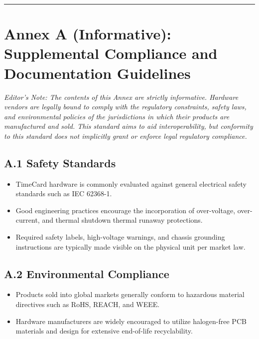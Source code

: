 \begin{center}\rule{0.5\linewidth}{0.5pt}\end{center}

\section{Annex A (Informative): Supplemental Compliance and
Documentation
Guidelines}\label{annex-a-informative-supplemental-compliance-and-documentation-guidelines}

\emph{Editor's Note: The contents of this Annex are strictly
informative. Hardware vendors are legally bound to comply with the
regulatory constraints, safety laws, and environmental policies of the
jurisdictions in which their products are manufactured and sold. This
standard aims to aid interoperability, but conformity to this standard
does not implicitly grant or enforce legal regulatory compliance.}

\subsection{A.1 Safety Standards}\label{a.1-safety-standards}

\begin{itemize}
\tightlist
\item
  TimeCard hardware is commonly evaluated against general electrical
  safety standards such as IEC 62368-1.
\item
  Good engineering practices encourage the incorporation of
  over-voltage, over-current, and thermal shutdown thermal runaway
  protections.
\item
  Required safety labels, high-voltage warnings, and chassis grounding
  instructions are typically made visible on the physical unit per
  market law.
\end{itemize}

\subsection{A.2 Environmental
Compliance}\label{a.2-environmental-compliance}

\begin{itemize}
\tightlist
\item
  Products sold into global markets generally conform to hazardous
  material directives such as RoHS, REACH, and WEEE.
\item
  Hardware manufacturers are widely encouraged to utilize halogen-free
  PCB materials and design for extensive end-of-life recyclability.
\end{itemize}

